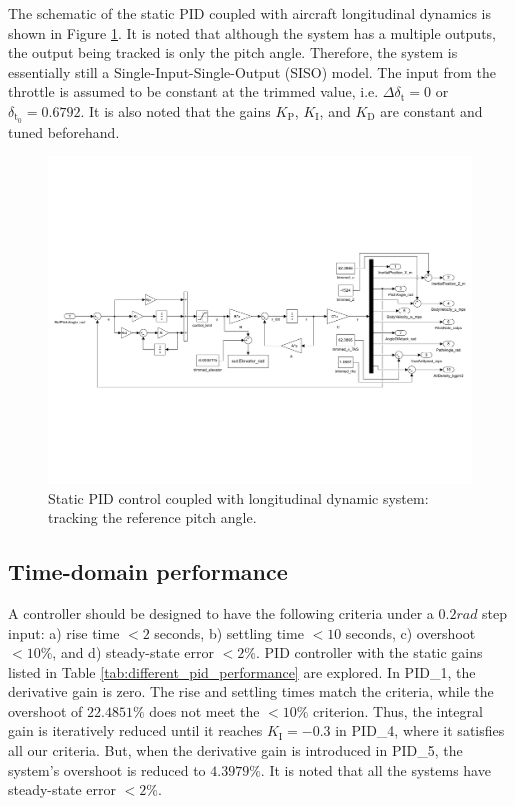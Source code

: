 \documentclass[lettersize,journal]{IEEEtran}
\begin{document}
The schematic of the static PID coupled with aircraft longitudinal dynamics is shown in Figure \ref{fig:pid_scheme}. It is noted that although the system has a multiple outputs, the output being tracked is only the pitch angle. Therefore, the system is essentially still a Single-Input-Single-Output (SISO) model. The input from the throttle is assumed to be constant at the trimmed value, i.e. $\Delta \delta_{\mathrm{t}} = 0$ or $\delta_{\mathrm{t}_0} = 0.6792$. It is also noted that the gains $K_{\mathrm{P}}$, $K_{\mathrm{I}}$, and $K_{\mathrm{D}}$ are constant and tuned beforehand.

\begin{figure}[!t]
\centering
\includegraphics[width=7in]{figs/pid_scheme.pdf}%
\caption{Static PID control coupled with longitudinal dynamic system: tracking the reference pitch angle.}
\label{fig:pid_scheme}
\end{figure}

\subsection{Time-domain performance}
A controller should be designed to have the following criteria under a $0.2rad$ step input: a) rise time $<2$ seconds, b) settling time $<10$ seconds, c) overshoot $<10\%$, and d) steady-state error $<2\%$. PID controller with the static gains listed in Table \ref{tab:different_pid_performance} are explored. In PID\_1, the derivative gain is zero. The rise and settling times match the criteria, while the overshoot of $22.4851\%$ does not meet the $<10\%$ criterion. Thus, the integral gain is iteratively reduced until it reaches $K_{\mathrm{I}}=-0.3$ in PID\_4, where it satisfies all our criteria. But, when the derivative gain is introduced in PID\_5, the system's overshoot is reduced to $4.3979\%$. It is noted that all the systems have steady-state error $<2\%$.
\end{document}
